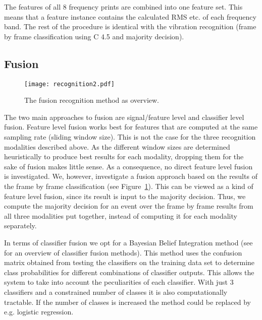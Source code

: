 The features of all 8 frequency prints are combined into one feature set.
This means that a feature instance contains the calculated RMS etc. of each 
frequency band. The rest of the procedure is identical with the 
vibration recognition (frame by frame classification using C 4.5 and
majority decision). 


\subsection{Fusion}
\label{sec:fusion}

\begin{figure}[t]
\centering  
\texttt{[image: recognition2.pdf]}
\caption{The fusion recognition method as overview.}
\label{fig:recognition}
\end{figure}
The two main approaches to fusion are signal/feature level and
classifier level fusion. Feature level fusion works best for features
that are computed at the same sampling rate (sliding window size).
This is not the case for the three recognition modalities described
above. As the different window sizes are determined heuristically to
produce best results for each modality, dropping them for the sake of
fusion makes little sense. As a consequence, no direct feature level
fusion is investigated. We, however, investigate a fusion
approach based on the results of the 
frame by frame classification (see Figure~\ref{fig:recognition}). This can be viewed as a kind 
of feature level fusion, since its result is
input to the majority decision. Thus, we compute
the majority decision for an event over the frame by frame results
from all three modalities put together, instead of computing it for
each modality separately.

In terms of classifier fusion we opt for a Bayesian Belief
Integration method (see \cite{ruta-overview} for an overview of
classifier fusion methods). This method uses the confusion matrix
obtained from testing the classifiers on the training data set to
determine class probabilities for different combinations of
classifier outputs. This allows the system to take into
account the peculiarities of each classifier. 
With just 3 classifiers and a constrained number of classes 
it is also computationally tractable. If the number of classes 
is increased the method could be replaced by e.g. logistic regression.

